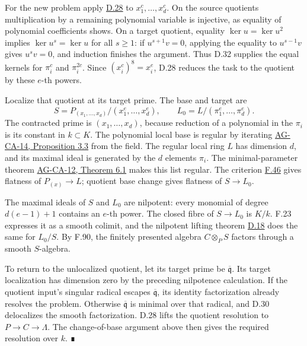 \documentclass[11pt,a4paper,openany]{report}
\begin{document}
For the new problem apply \hyperref[AG-RG-S05-smoothing-lemma-lift-solution]{D.28} to \(x_1^c,\ldots,x_d^c\). On the source quotients multiplication by a remaining polynomial variable is injective, as equality of polynomial coefficients shows. On a target quotient, equality \(\ker u=\ker u^2\) implies \(\ker u^s=\ker u\) for all \(s\ge1\): if \(u^{s+1}v=0\), applying the equality to \(u^{s-1}v\) gives \(u^sv=0\), and induction finishes the argument. Thus D.32 supplies the equal kernels for \(\pi_i^c\) and \(\pi_i^{2c}\). Since \((x_i^c)^8=x_i^e\), D.28 reduces the task to the quotient by these \(e\)-th powers.

Localize that quotient at its target prime. The base and target are \[
S=P_{(x_1,\ldots,x_d)}/(x_1^e,\ldots,x_d^e),
\qquad L_0=L/(\pi_1^e,\ldots,\pi_d^e).
\] The contracted prime is \((x_1,\ldots,x_d)\), because reduction of a polynomial in the \(\pi_i\) is its constant in \(k\subset K\). The polynomial local base is regular by iterating \href{https://github.com/KokunoYumeto/open-math-courses/blob/d02d0a3669f42579db037cd44de1d113fdd770a1/docs/courses/AG-CA/src/regular-local-rings.md}{AG-CA-14, Proposition 3.3} from the field. The regular local ring \(L\) has dimension \(d\), and its maximal ideal is generated by the \(d\) elements \(\pi_i\). The minimal-parameter theorem \href{https://github.com/KokunoYumeto/open-math-courses/blob/d02d0a3669f42579db037cd44de1d113fdd770a1/docs/courses/AG-CA/src/regular-sequences-depth-and-cohen-macaulay-modules.md}{AG-CA-12, Theorem 6.1} makes this list regular. The criterion \hyperref[AG-RG-S05-algebra-lemma-flat-over-regular]{F.46} gives flatness of \(P_{(x)}\to L\); quotient base change gives flatness of \(S\to L_0\).

The maximal ideals of \(S\) and \(L_0\) are nilpotent: every monomial of degree \(d(e-1)+1\) contains an \(e\)-th power. The closed fibre of \(S\to L_0\) is \(K/k\). F.23 expresses it as a smooth colimit, and the nilpotent lifting theorem \hyperref[AG-RG-S05-smoothing-proposition-lift]{D.18} does the same for \(L_0/S\). By F.90, the finitely presented algebra \(C\otimes_P S\) factors through a smooth \(S\)-algebra.

To return to the unlocalized quotient, let its target prime be \(\overline{\mathfrak q}\). Its target localization has dimension zero by the preceding nilpotence calculation. If the quotient input's singular radical escapes \(\overline{\mathfrak q}\), its identity factorization already resolves the problem. Otherwise \(\overline{\mathfrak q}\) is minimal over that radical, and D.30 delocalizes the smooth factorization. D.28 lifts the quotient resolution to \(P\to C\to\Lambda\). The change-of-base argument above then gives the required resolution over \(k\). ∎
\end{document}
